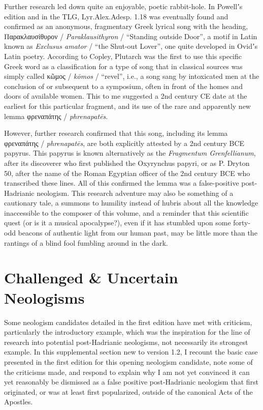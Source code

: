 Further research led down quite an enjoyable, poetic rabbit-hole. 
In Powellʼs edition %
and in the TLG, Lyr.Alex.Adesp. 1.18 was eventually found and confirmed %
as an anonymous, fragmentary Greek lyrical song with the heading, %
Παρακλαυσίθυρον / \textit{Paraklausithyron} / “Standing outside Door”, %
a motif in Latin known as \textit{Exclusus amator} / “the Shut-out Lover”, %
one quite developed in Ovidʼs Latin poetry. %
According to Copley, Plutarch was the first to use this specific Greek word as a classification %
for a type of song that in classical sources was simply called κῶμος / \textit{kōmos} / “revel”, %
i.e., a song sang by intoxicated men at the conclusion of or subsequent to a symposium, %
often in front of the homes and doors of available women. %
This to me suggested a 2nd century CE date at the earliest for this particular fragment, %
and its use of the rare and apparently new lemma φρεναπάτης / \textit{phrenapatēs}. %

However, further research confirmed that this song, including its lemma φρεναπάτης / \textit{phrenapatēs}, %
are both explicitly attested by a 2nd century BCE papyrus. %
This papyrus is known alternatively as the \textit{Fragmentum Grenfellianum}, %
after its discoverer who first published the Oxyrynchus papyri, %
or as P. Dryton 50, after the name of the Roman Egyptian officer of the 2nd century BCE %
who transcribed these lines. %
All of this confirmed the lemma was a false-positive post-Hadrianic neologism. %
This research adventure may also be something of a cautionary tale, %
a summons to humility instead of hubris about all the knowledge inaccessible to the composer of this volume, %
and a reminder that this scientific quest (or is it a musical apocalypse?), %
even if it has stumbled upon some forty-odd beacons of authentic light from our human past, %
may be little more than the rantings of a blind fool fumbling around in the dark. \clearpage

\section{Challenged \& Uncertain Neologisms}

\noindent{}Some neologism candidates detailed in the first edition have met with criticism, %
particularly the introductory example, %
which was the inspiration for the line of research into potential post-Hadrianic neologisms, %
not necessarily its strongest example. %
In this supplemental section new to version 1.2, %
I recount the basic case presented in the first edition for this opening neologism candidate, %
note some of the criticisms made, %
and respond to explain why I am not yet convinced it %
can yet reasonably be dismissed as a false positive post-Hadrianic neologism that first originated, %
or was at least first popularized, outside of the canonical Acts of the Apostles. \\[1mm]

